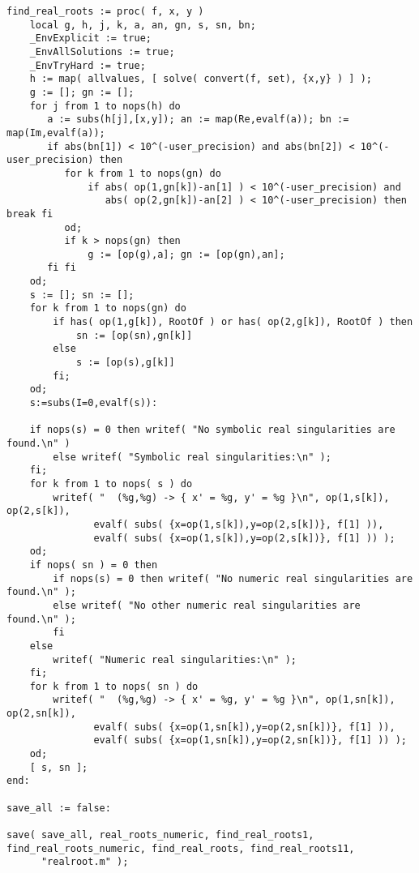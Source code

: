\documentclass[a4paper,10pt]{article}
\begin{document}
\begin{lstlisting}[name=realroot]
find_real_roots := proc( f, x, y )
    local g, h, j, k, a, an, gn, s, sn, bn;
    _EnvExplicit := true;
    _EnvAllSolutions := true;
    _EnvTryHard := true;
    h := map( allvalues, [ solve( convert(f, set), {x,y} ) ] );
    g := []; gn := [];
    for j from 1 to nops(h) do
       a := subs(h[j],[x,y]); an := map(Re,evalf(a)); bn := map(Im,evalf(a));
       if abs(bn[1]) < 10^(-user_precision) and abs(bn[2]) < 10^(-user_precision) then
          for k from 1 to nops(gn) do
              if abs( op(1,gn[k])-an[1] ) < 10^(-user_precision) and
                 abs( op(2,gn[k])-an[2] ) < 10^(-user_precision) then break fi
          od;
          if k > nops(gn) then
              g := [op(g),a]; gn := [op(gn),an];
       fi fi
    od;
    s := []; sn := [];
    for k from 1 to nops(gn) do
        if has( op(1,g[k]), RootOf ) or has( op(2,g[k]), RootOf ) then
            sn := [op(sn),gn[k]]
        else
            s := [op(s),g[k]]
        fi;
    od;
    s:=subs(I=0,evalf(s)):

    if nops(s) = 0 then writef( "No symbolic real singularities are found.\n" )
        else writef( "Symbolic real singularities:\n" );
    fi;
    for k from 1 to nops( s ) do
        writef( "  (%g,%g) -> { x' = %g, y' = %g }\n", op(1,s[k]), op(2,s[k]),
               evalf( subs( {x=op(1,s[k]),y=op(2,s[k])}, f[1] )),
               evalf( subs( {x=op(1,s[k]),y=op(2,s[k])}, f[1] )) );
    od;
    if nops( sn ) = 0 then
        if nops(s) = 0 then writef( "No numeric real singularities are found.\n" );
        else writef( "No other numeric real singularities are found.\n" );
        fi
    else
        writef( "Numeric real singularities:\n" );
    fi;
    for k from 1 to nops( sn ) do
        writef( "  (%g,%g) -> { x' = %g, y' = %g }\n", op(1,sn[k]), op(2,sn[k]),
               evalf( subs( {x=op(1,sn[k]),y=op(2,sn[k])}, f[1] )),
               evalf( subs( {x=op(1,sn[k]),y=op(2,sn[k])}, f[1] )) );
    od;
    [ s, sn ];
end:

save_all := false:

save( save_all, real_roots_numeric, find_real_roots1, find_real_roots_numeric, find_real_roots, find_real_roots11,
      "realroot.m" );
\end{lstlisting}
\end{document}
